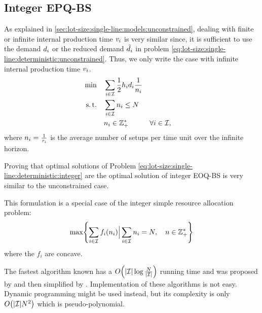 


\subsection{Integer EPQ-BS}


As explained in \cref{sec:lot-size:single-line:models:unconstrained}, dealing with finite or infinite internal production time $v_i$ is very similar since, it is sufficient to use the demand $d_i$ or the reduced demand $\tilde{d}_i$ in problem \eqref{eq:lot-size:single-line:deterministic:unconstrained}.
Thus, we only write the case with infinite internal production time $v_i$.
\begin{subequations}\label{eq:lot-size:single-line:deterministic:integer}
  \begin{align}
  \min\quad & \displaystyle\sum_{i\in\mathcal{I}} \frac{1}{2}h_id_i\frac{1}{n_i}
  \label{eq:lot-size:single-line:deterministic:integer:objective}
  \\
  \operatorname{s.t.}\quad  & \displaystyle\sum_{i\in\mathcal{I}} n_i \le N
  \label{eq:lot-size:single-line:deterministic:integer:flexibility}
  \\
       & n_i \in \mathbb{Z}_+^* && \forall i\in\mathcal{I},
  \label{eq:lot-size:single-line:deterministic:integer:positivity}
  \end{align}
\end{subequations}
where $n_i=\frac{1}{\tau_i}$ is the average number of setups per time unit over the infinite horizon.


Proving that optimal solutions of Problem \eqref{eq:lot-size:single-line:deterministic:integer} are the optimal solution of integer EOQ-BS is very similar to the unconstrained case.


\medskip


This formulation is a special case of the integer simple resource allocation problem:
\begin{equation}
  \max\crbracket{\sum_{i\in\REF} f_i\bracket{\freq_i} \Big| \sum_{i\in\REF}\freq_i=\nbsetups,\quad\freq\in \ZZ_+^*}
\end{equation}
where the $f_i$ are concave.

The fastest algorithm known has a $O\bracket{\card{\REF}\log{\frac{\nbsetups}{\card{\REF}}}}$ running time and was proposed by \cite{Frederickson1982} and then simplified by \cite{Hochbaum1994}.
Implementation of these algorithms is not easy.
Dynamic programming might be used instead, but its complexity is only $O\bracket{\card{\REF}\nbsetups^2}$ which is pseudo-polynomial.



